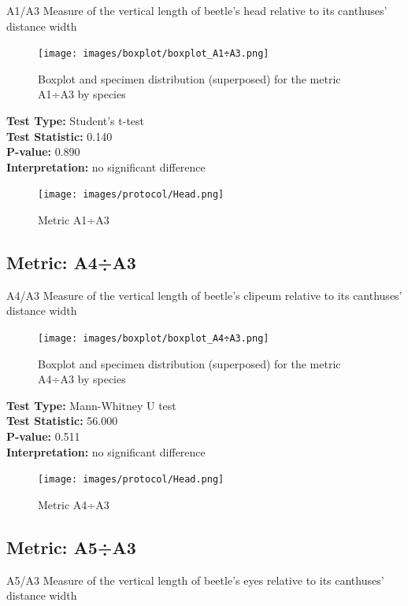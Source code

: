 A1/A3 Measure of the vertical length of beetle's head relative to its canthuses' distance width

\begin{figure}[H]
\centering
\texttt{[image: images/boxplot/boxplot\_A1÷A3.png]}
\caption{  Boxplot and specimen distribution (superposed) for the metric  A1÷A3 by species}
\end{figure}

\noindent\textbf{Test Type:} Student's t-test \\
\noindent\textbf{Test Statistic:} 0.140 \\
\noindent\textbf{P-value:} 0.890 \\
\noindent\textbf{Interpretation:} no significant difference

\begin{figure}[H]
\centering
\texttt{[image: images/protocol/Head.png]}
\caption{ Metric A1÷A3}
\end{figure}

\newpage
\subsection*{Metric: A4÷A3}

A4/A3 Measure of the vertical length of beetle's clipeum relative to its canthuses' distance width

\begin{figure}[H]
\centering
\texttt{[image: images/boxplot/boxplot\_A4÷A3.png]}
\caption{  Boxplot and specimen distribution (superposed) for the metric  A4÷A3 by species}
\end{figure}

\noindent\textbf{Test Type:} Mann-Whitney U test \\
\noindent\textbf{Test Statistic:} 56.000 \\
\noindent\textbf{P-value:} 0.511 \\
\noindent\textbf{Interpretation:} no significant difference

\begin{figure}[H]
\centering
\texttt{[image: images/protocol/Head.png]}
\caption{ Metric A4÷A3}
\end{figure}

\newpage
\subsection*{Metric: A5÷A3}

A5/A3 Measure of the vertical length of beetle's eyes relative to its canthuses' distance width

